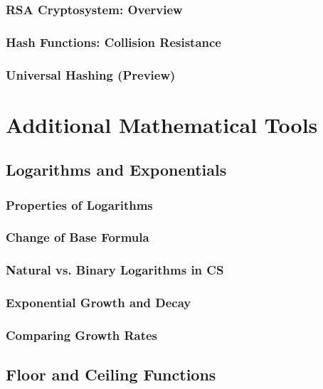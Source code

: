 \subsubsection{RSA Cryptosystem: Overview}
\subsubsection{Hash Functions: Collision Resistance}
\subsubsection{Universal Hashing (Preview)}

\section{Additional Mathematical Tools}
\label{sec:additional-tools}

\subsection{Logarithms and Exponentials}
\label{subsec:log-exp}

\subsubsection{Properties of Logarithms}
\subsubsection{Change of Base Formula}
\subsubsection{Natural vs. Binary Logarithms in CS}
\subsubsection{Exponential Growth and Decay}
\subsubsection{Comparing Growth Rates}

\subsection{Floor and Ceiling Functions}
\label{subsec:floor-ceiling}

